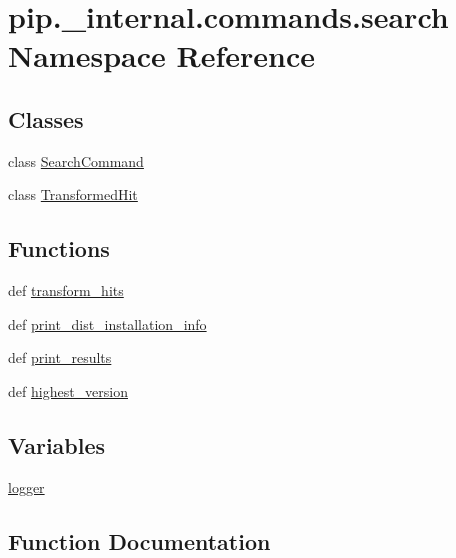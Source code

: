 \hypertarget{namespacepip_1_1__internal_1_1commands_1_1search}{}\section{pip.\+\_\+internal.\+commands.\+search Namespace Reference}
\label{namespacepip_1_1__internal_1_1commands_1_1search}
\subsection*{Classes}
\begin{DoxyCompactItemize}
\item 
class \hyperlink{classpip_1_1__internal_1_1commands_1_1search_1_1SearchCommand}{Search\+Command}
\item 
class \hyperlink{classpip_1_1__internal_1_1commands_1_1search_1_1TransformedHit}{Transformed\+Hit}
\end{DoxyCompactItemize}
\subsection*{Functions}
\begin{DoxyCompactItemize}
\item 
def \hyperlink{namespacepip_1_1__internal_1_1commands_1_1search_a24743757eb49853916f48ccc9784c1a9}{transform\+\_\+hits}
\item 
def \hyperlink{namespacepip_1_1__internal_1_1commands_1_1search_aa2b9855d40e18a1e8024714922f67d1c}{print\+\_\+dist\+\_\+installation\+\_\+info}
\item 
def \hyperlink{namespacepip_1_1__internal_1_1commands_1_1search_afdaa2c0ea9a0fa299e7aeaa97c8cd656}{print\+\_\+results}
\item 
def \hyperlink{namespacepip_1_1__internal_1_1commands_1_1search_a4cf5522d1664b85f9c2eb2beb1786f94}{highest\+\_\+version}
\end{DoxyCompactItemize}
\subsection*{Variables}
\begin{DoxyCompactItemize}
\item 
\hyperlink{namespacepip_1_1__internal_1_1commands_1_1search_a5fbc5a05d0439034dab94ba276f9778b}{logger}
\end{DoxyCompactItemize}


\subsection{Function Documentation}
\mbox{\label{namespacepip_1_1__internal_1_1commands_1_1search_a4cf5522d1664b85f9c2eb2beb1786f94}} 
